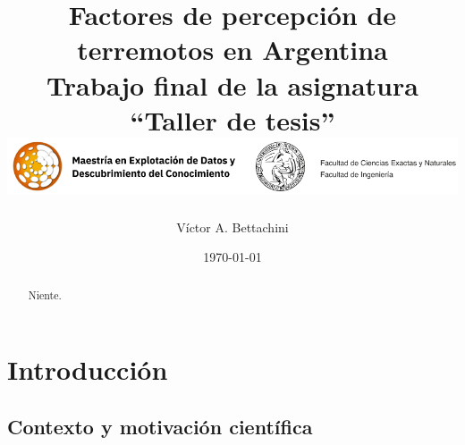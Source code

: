 \documentclass[a4paper]{report}
\begin{document}
\title{
	{Factores de percepción de terremotos en Argentina}\\[1 cm]
	{Trabajo final de la asignatura ``Taller de tesis''}
	{\includegraphics[width=\textwidth]{logos}}
}
\author{Víctor A. Bettachini}
\date{\today}
\maketitle

\begin{abstract}
	Niente.
\end{abstract}

\tableofcontents


\chapter{Introducción}

\section{Contexto y motivación científica}
\end{document}
